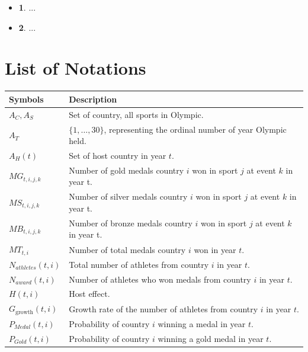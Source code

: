 \documentclass{mcmthesis}
\begin{document}
	\begin{itemize}
		\item {\bf 1}. ...
		\item {\bf 2}. ...	
	\end{itemize}
	
	
	
	
	
	
	
	
	
	
\section{List of Notations}
\begin{center}
	\begin{tabular}{ll}
		\toprule
		{\bf Symbols} & {\bf Description}  \\
		\midrule 
		$A_{C},A_{S}$ & Set of country, all sports in Olympic.\\
		$A_{T}$ & $\{1,\dots,30\}$, representing the ordinal number of year Olympic held. \\
		$A_{H}(t)$ & Set of host country in year $t$. \\
		$MG_{t,i,j,k}$ & Number of gold medals country $i$ won in sport $j$ at event $k$ in year t. \\
		$MS_{t,i,j,k}$ & Number of silver medals country $i$ won in sport $j$ at event $k$ in year t. \\
		$MB_{t,i,j,k}$ & Number of bronze medals country $i$ won in sport $j$ at event $k$ in year t. \\
		$MT_{t,i}$ & Number of total medals country $i$ won in year $t$. \\
		$N_{athletes}(t,i)$ & Total number of athletes from country $i$ in year $t$. \\
		$N_{award}(t,i)$ & Number of athletes who won medals from country $i$ in year $t$. \\
		$H(t,i)$ & Host effect. \\
		$G_{\text{growth}}(t,i)$ & Growth rate of the number of athletes from country $i$ in year $t$.\\
		$P_{Medal}(t,i)$ & Probability of country $i$ winning a medal in year $t$.\\
		$P_{Gold}(t,i)$ & Probability of country $i$ winning a gold medal in year $t$.\\
		\bottomrule
	\end{tabular}
\end{center}
\end{document}
